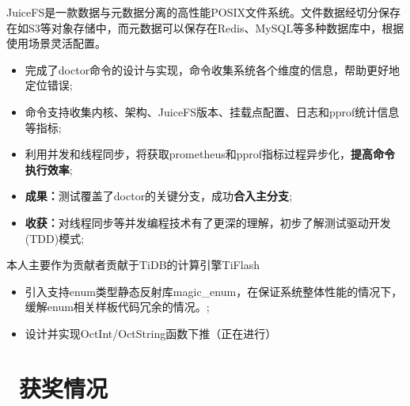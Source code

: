 \documentclass{resume}
\begin{document}
JuiceFS是一款数据与元数据分离的高性能POSIX文件系统。文件数据经切分保存在如S3等对象存储中，而元数据可以保存在Redis、MySQL等多种数据库中，根据使用场景灵活配置。

\begin{onehalfspacing}
  \begin{itemize}
    \item 完成了doctor命令的设计与实现，命令收集系统各个维度的信息，帮助更好地定位错误;
    \item 命令支持收集内核、架构、JuiceFS版本、挂载点配置、日志和pprof统计信息等指标;
    \item 利用并发和线程同步，将获取prometheus和pprof指标过程异步化，\textbf{提高命令执行效率};
    \item \textbf{成果：}测试覆盖了doctor的关键分支，成功\textbf{合入主分支};
    \item \textbf{收获：}对线程同步等并发编程技术有了更深的理解，初步了解测试驱动开发(TDD)模式;
  \end{itemize}
\end{onehalfspacing}

本人主要作为贡献者贡献于TiDB的计算引擎TiFlash
\begin{itemize}
  \item 引入支持enum类型静态反射库magic\_enum，在保证系统整体性能的情况下，缓解enum相关样板代码冗余的情况。;
  \item 设计并实现OctInt/OctString函数下推（正在进行）
\end{itemize}

\section{\faHeartO\ 获奖情况}
\end{document}
